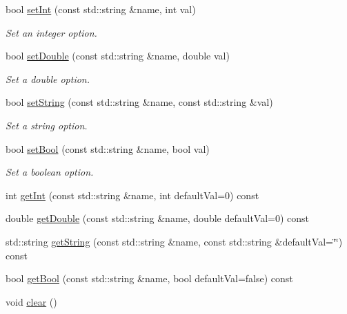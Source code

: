 \begin{DoxyCompactItemize}
\item 
bool \hyperlink{class_lots_of_lines_1_1_visualization_options_a8a3f354ffd70587b5756d3059d944fe6}{set\+Int} (const std\+::string \&name, int val)
\begin{DoxyCompactList}\small\item\em Set an integer option. \end{DoxyCompactList}\item 
bool \hyperlink{class_lots_of_lines_1_1_visualization_options_ae7021819f5b5d35aeeed3e267d716594}{set\+Double} (const std\+::string \&name, double val)
\begin{DoxyCompactList}\small\item\em Set a double option. \end{DoxyCompactList}\item 
bool \hyperlink{class_lots_of_lines_1_1_visualization_options_ac1c82295a5dfa5c6f4f143e7a9aa999c}{set\+String} (const std\+::string \&name, const std\+::string \&val)
\begin{DoxyCompactList}\small\item\em Set a string option. \end{DoxyCompactList}\item 
bool \hyperlink{class_lots_of_lines_1_1_visualization_options_aa5e71fe97363193855da10026ecc7432}{set\+Bool} (const std\+::string \&name, bool val)
\begin{DoxyCompactList}\small\item\em Set a boolean option. \end{DoxyCompactList}\item 
int \hyperlink{class_lots_of_lines_1_1_visualization_options_aac0c439a49fc160b49c57486c424a685}{get\+Int} (const std\+::string \&name, int default\+Val=0) const 
\item 
double \hyperlink{class_lots_of_lines_1_1_visualization_options_a679424b8e540c4745d27c3ec8e8bde45}{get\+Double} (const std\+::string \&name, double default\+Val=0) const 
\item 
std\+::string \hyperlink{class_lots_of_lines_1_1_visualization_options_a1fc1958635c86f4c8b4c8bdf84736200}{get\+String} (const std\+::string \&name, const std\+::string \&default\+Val=\char`\"{}\char`\"{}) const 
\item 
bool \hyperlink{class_lots_of_lines_1_1_visualization_options_a3b33ac20e7d79be9c15b74878996189e}{get\+Bool} (const std\+::string \&name, bool default\+Val=false) const 
\item 
void \hyperlink{class_lots_of_lines_1_1_visualization_options_a1e6f0ffb2bf3c49bdf8cfbf1ad5dd2d0}{clear} ()\hypertarget{class_lots_of_lines_1_1_visualization_options_a1e6f0ffb2bf3c49bdf8cfbf1ad5dd2d0}{}\label{class_lots_of_lines_1_1_visualization_options_a1e6f0ffb2bf3c49bdf8cfbf1ad5dd2d0}


\end{DoxyCompactItemize}
